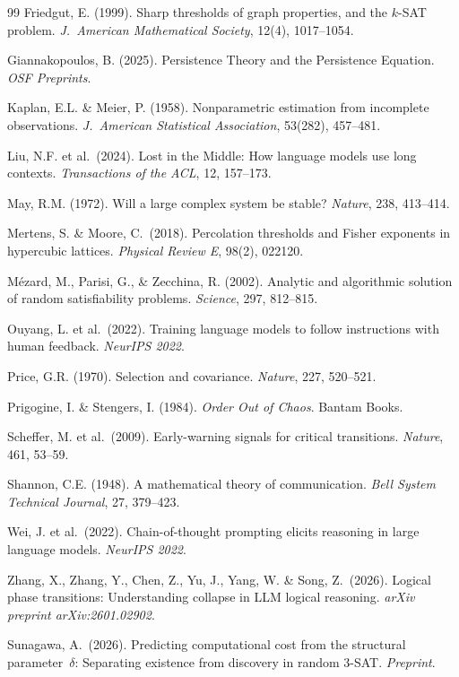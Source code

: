 \documentclass[11pt,a4paper]{article}
\begin{document}
\begin{thebibliography}{99}
Friedgut, E. (1999).
Sharp thresholds of graph properties, and the $k$-SAT problem.
\emph{J.\ American Mathematical Society}, 12(4), 1017--1054.

Giannakopoulos, B. (2025).
Persistence Theory and the Persistence Equation.
\emph{OSF Preprints}.

Kaplan, E.L. \& Meier, P. (1958).
Nonparametric estimation from incomplete observations.
\emph{J.\ American Statistical Association}, 53(282), 457--481.

Liu, N.F. et al.\ (2024).
Lost in the Middle: How language models use long contexts.
\emph{Transactions of the ACL}, 12, 157--173.

May, R.M. (1972).
Will a large complex system be stable?
\emph{Nature}, 238, 413--414.

Mertens, S. \& Moore, C.\ (2018).
Percolation thresholds and Fisher exponents in hypercubic lattices.
\emph{Physical Review E}, 98(2), 022120.

M\'{e}zard, M., Parisi, G., \& Zecchina, R. (2002).
Analytic and algorithmic solution of random satisfiability problems.
\emph{Science}, 297, 812--815.

Ouyang, L. et al.\ (2022).
Training language models to follow instructions with human feedback.
\emph{NeurIPS 2022}.

Price, G.R. (1970).
Selection and covariance.
\emph{Nature}, 227, 520--521.

Prigogine, I. \& Stengers, I. (1984).
\emph{Order Out of Chaos}.
Bantam Books.

Scheffer, M. et al.\ (2009).
Early-warning signals for critical transitions.
\emph{Nature}, 461, 53--59.

Shannon, C.E. (1948).
A mathematical theory of communication.
\emph{Bell System Technical Journal}, 27, 379--423.

Wei, J. et al.\ (2022).
Chain-of-thought prompting elicits reasoning in large language models.
\emph{NeurIPS 2022}.

Zhang, X., Zhang, Y., Chen, Z., Yu, J., Yang, W. \& Song, Z.\ (2026).
Logical phase transitions: Understanding collapse in LLM logical reasoning.
\emph{arXiv preprint arXiv:2601.02902}.

Sunagawa, A.\ (2026).
Predicting computational cost from the structural parameter~$\delta$: Separating existence from discovery in random 3-SAT.
\emph{Preprint}.


\end{thebibliography}
\end{document}

